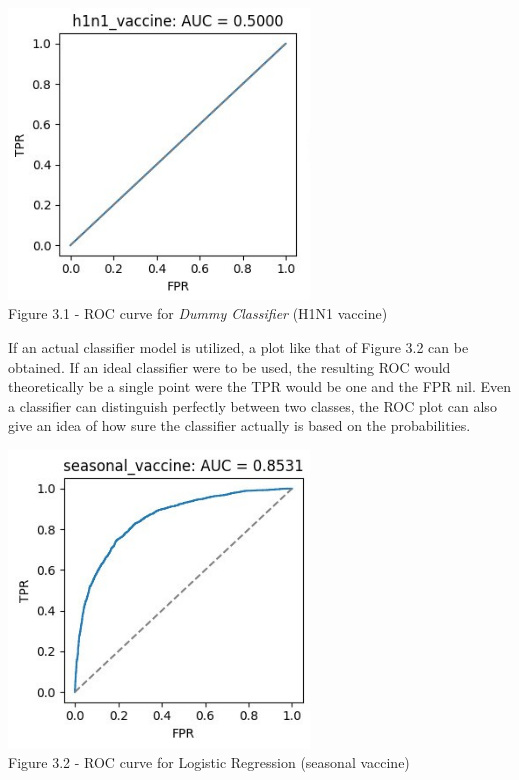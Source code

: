 \documentclass{IEEEtran}
\begin{document}
\begin{center}
    \includegraphics[width=8cm]{figures/ROC_Dummy_Classifier.png}\\
    Figure 3.1 - ROC curve for \textit{Dummy Classifier} (H1N1 vaccine)
\end{center}

If an actual classifier model is utilized, a plot like that of Figure 3.2 can be obtained. If an ideal classifier were to be used, the resulting ROC would theoretically be a single point were the TPR would be one and the FPR nil. Even a classifier can distinguish perfectly between two classes, the ROC plot can also give an idea of how sure the classifier actually is based on the probabilities.

\begin{center}
    \includegraphics[width=8cm]{figures/ROC_CatBoost.png}\\
    Figure 3.2 - ROC curve for Logistic Regression (seasonal vaccine)
\end{center}
\end{document}
